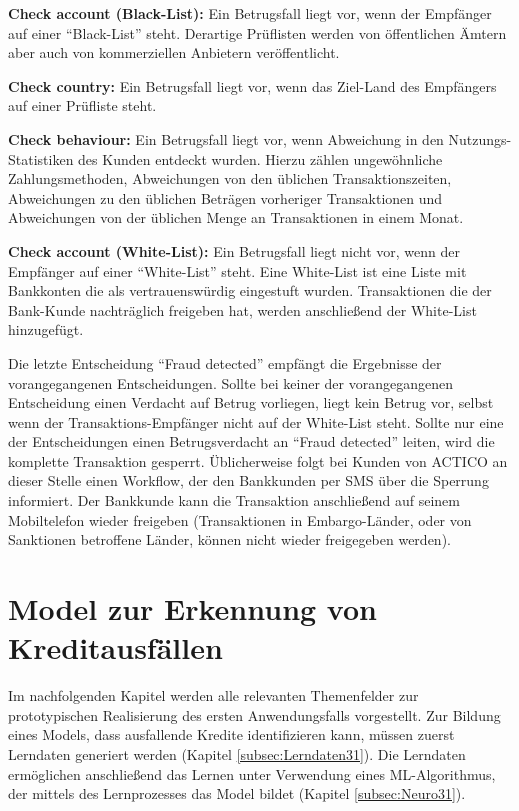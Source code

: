 \begin{itemize*}
\item \textbf{Check account (Black-List):} Ein Betrugsfall liegt vor, wenn der Empfänger auf einer "`Black-List"' steht. Derartige Prüflisten werden von öffentlichen Ämtern aber auch von kommerziellen Anbietern veröffentlicht. 
\item \textbf{Check country:} Ein Betrugsfall liegt vor, wenn das Ziel-Land des Empfängers auf einer Prüfliste steht. 
\item \textbf{Check behaviour:} Ein Betrugsfall liegt vor, wenn Abweichung in den Nutzungs-Statistiken des Kunden entdeckt wurden. Hierzu zählen ungewöhnliche Zahlungsmethoden, Abweichungen von den üblichen Transaktionszeiten, Abweichungen zu den üblichen Beträgen vorheriger Transaktionen und Abweichungen von der üblichen Menge an Transaktionen in einem Monat.
\item \textbf{Check account (White-List):} Ein Betrugsfall liegt nicht vor, wenn der Empfänger auf einer "`White-List"' steht. Eine White-List ist eine Liste mit Bankkonten die als vertrauenswürdig eingestuft wurden. Transaktionen die der Bank-Kunde nachträglich freigeben hat, werden anschließend der White-List hinzugefügt. 
\end{itemize*}

Die letzte Entscheidung "`Fraud detected"' empfängt die Ergebnisse der vorangegangenen Entscheidungen. Sollte bei keiner der vorangegangenen Entscheidung einen Verdacht auf Betrug vorliegen, liegt kein Betrug vor, selbst wenn der Transaktions-Empfänger nicht auf der White-List steht. Sollte nur eine der Entscheidungen einen Betrugsverdacht an "`Fraud detected"' leiten, wird die komplette Transaktion gesperrt. Üblicherweise folgt bei Kunden von ACTICO an dieser Stelle einen Workflow, der den Bankkunden per SMS über die Sperrung informiert. Der Bankkunde kann die Transaktion anschließend auf seinem Mobiltelefon wieder freigeben (Transaktionen in Embargo-Länder, oder von Sanktionen betroffene Länder, können nicht wieder freigegeben werden).    

\section{Model zur Erkennung von Kreditausfällen}
\label{sec:usecase1}

Im nachfolgenden Kapitel werden alle relevanten Themenfelder zur prototypischen Realisierung des ersten Anwendungsfalls vorgestellt. Zur Bildung eines Models, dass ausfallende Kredite identifizieren kann, müssen zuerst Lerndaten generiert werden  (Kapitel \ref{subsec:Lerndaten31}). Die Lerndaten ermöglichen anschließend das Lernen unter Verwendung eines ML-Algorithmus, der mittels des Lernprozesses das Model bildet (Kapitel \ref{subsec:Neuro31}).

